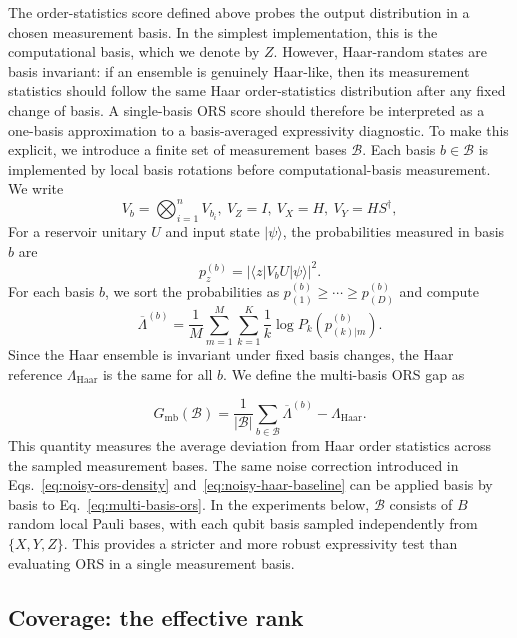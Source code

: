 \documentclass[
    aps,
    pre,
    amsmath,
    amssymb,
    reprint,
    superscriptaddress,
    preprintnumbers,
]{revtex4-2}
\begin{document}
The order-statistics score defined above probes the output distribution in a chosen measurement basis. In the simplest implementation, this is the computational basis, which we denote by $Z$. However, Haar-random states are basis invariant: if an ensemble is genuinely Haar-like, then its measurement statistics should follow the same Haar order-statistics distribution after any fixed change of basis. A single-basis ORS score should therefore be interpreted as a one-basis approximation to a basis-averaged expressivity diagnostic. To make this explicit, we introduce a finite set of measurement bases $\mathcal{B}$. Each basis $b \in \mathcal{B}$ is implemented by local basis rotations before computational-basis measurement. We write
%
\begin{equation}
    V_b=\bigotimes_{i=1}^{n} V_{b_i},
\
V_Z=I,
\
V_X=H,
\
V_Y=H S^\dagger,
\end{equation}
%
For a reservoir unitary $U$ and input state
$|\psi\rangle$, the probabilities measured in basis $b$ are
\[
p_z^{(b)}
=
\left|
\langle z|V_b U|\psi\rangle
\right|^2 .
\]
For each basis $b$, we sort the probabilities as
$p_{(1)}^{(b)} \geq \cdots \geq p_{(D)}^{(b)}$ and compute
\[
\overline{\Lambda}^{(b)}
=
\frac{1}{M}
\sum_{m=1}^{M}
\sum_{k=1}^{K}
\frac{1}{k}
\log P_k
\left(
p_{(k)|m}^{(b)}
\right).
\]
Since the Haar ensemble is invariant under fixed basis changes, the Haar reference $\Lambda_{\mathrm{Haar}}$ is the same for all $b$. We define the multi-basis ORS gap as

\begin{equation}
    G_{\mathrm{mb}}(\mathcal{B})
=
\frac{1}{|\mathcal{B}|}
\sum_{b\in\mathcal{B}}
\overline{\Lambda}^{(b)}
-
\Lambda_{\mathrm{Haar}} .
\label{eq:multi-basis-ors}
\end{equation}
This quantity measures the average deviation from Haar order statistics across the sampled measurement bases. The same noise correction introduced in Eqs.~\eqref{eq:noisy-ors-density} and~\eqref{eq:noisy-haar-baseline} can be applied basis by basis to Eq.~\eqref{eq:multi-basis-ors}. In the experiments below, $\mathcal{B}$ consists of $B$ random local Pauli bases, with each qubit basis sampled independently from $\{X,Y,Z\}$. This provides a stricter and more robust expressivity test than evaluating ORS in a single measurement basis.

\subsection{Coverage: the effective rank}
\label{sec:methods-reff}
\end{document}
